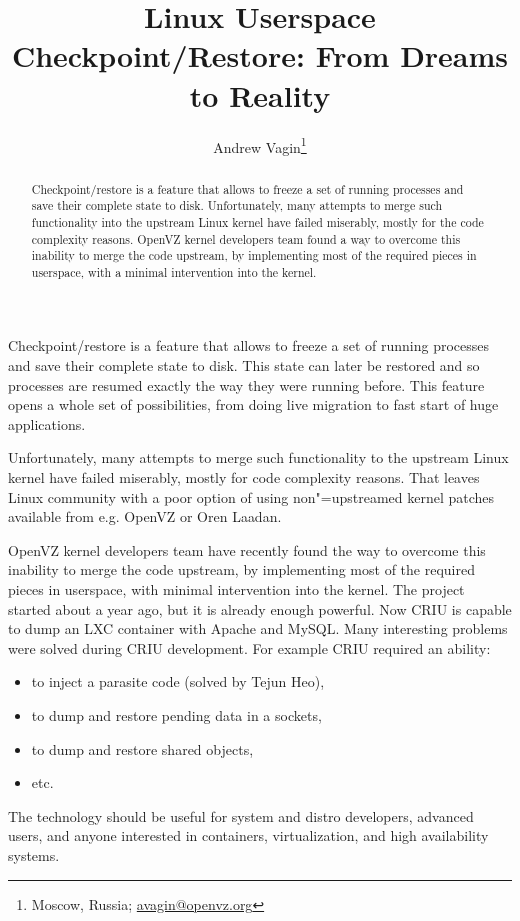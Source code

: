 \documentclass[10pt, a5paper]{article}
\begin{document}
\title{Linux Userspace Checkpoint/Restore: From Dreams to Reality}%

\author{Andrew Vagin\footnote{Moscow, Russia; \url{avagin@openvz.org}}}
\maketitle

\begin{abstract}
Checkpoint/restore is a feature that allows to freeze a set of running processes and save their complete state to disk. \linebreak Unfortunately, many attempts to merge such functionality into the upstream Linux kernel have failed miserably, mostly for the code complexity reasons. OpenVZ kernel developers team found a way to overcome this inability to merge the code upstream, by implementing most of the required pieces in userspace, with a minimal intervention into the kernel.
\end{abstract}

Checkpoint/restore is a feature that allows to freeze a set of running processes and save their complete state to disk. This state can later be restored and so processes are resumed exactly the way they were running before. This feature opens a whole set of possibilities, from doing live migration to fast start of huge applications.

Unfortunately, many attempts to merge such functionality to the upstream Linux kernel have failed miserably, mostly for code complexity reasons. That leaves Linux community with a poor option of using non"=upstreamed kernel patches available from e.g. OpenVZ or Oren Laadan.

OpenVZ kernel developers team have recently found the way to overcome this inability to merge the code upstream, by implementing most of the required pieces in userspace, with minimal intervention into the kernel.
The project started about a year ago, but it is already enough powerful. Now CRIU is capable to dump an LXC container with Apache and MySQL.
Many interesting problems were solved during CRIU development.
For example CRIU required an ability:

\begin{itemize}
  \item to inject a parasite code (solved by Tejun Heo),
  \item to dump and restore pending data in a sockets,
  \item to dump and restore shared objects,
  \item etc.
\end{itemize}

The technology should be useful for system and distro developers, advanced users, and anyone interested in containers, virtualization, and high availability systems.
\end{document}
